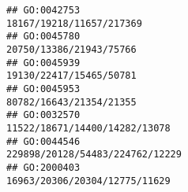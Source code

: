 \documentclass[
]{article}
\begin{document}
\begin{verbatim}
## GO:0042753                                                                                                                                                                                                                                                                                                                                                                                     18167/19218/11657/217369
## GO:0045780                                                                                                                                                                                                                                                                                                                                                                                      20750/13386/21943/75766
## GO:0045939                                                                                                                                                                                                                                                                                                                                                                                      19130/22417/15465/50781
## GO:0045953                                                                                                                                                                                                                                                                                                                                                                                      80782/16643/21354/21355
## GO:0032570                                                                                                                                                                                                                                                                                                                                                                                11522/18671/14400/14282/13078
## GO:0044546                                                                                                                                                                                                                                                                                                                                                                              229898/20128/54483/224762/12229
## GO:2000403                                                                                                                                                                                                                                                                                                                                                                                16963/20306/20304/12775/11629

\end{verbatim}
\end{document}
